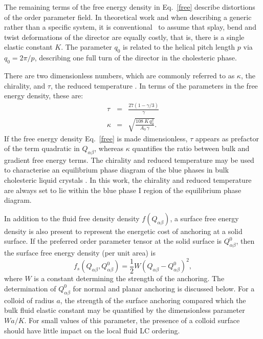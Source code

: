 \documentclass[12pt,twoside]{article}
\begin{document}
The remaining terms of the free energy density in Eq.~\ref{free} describe
distortions of the order parameter field. In theoretical work and when
describing a generic rather than a specific system, it is 
conventional~\cite{blue1,deGennes} to
assume that splay, bend and twist deformations of the director are equally
costly, that is, there is a single elastic constant $K$. The parameter $q_0$
is related to the helical pitch length $p$ via $q_0=2\pi/p$,
describing one full turn of the director in the cholesteric phase.

There are two dimensionless numbers, which are commonly referred to as
$\kappa$, the chirality, and  $\tau$, the reduced temperature
\cite{blue1}.  In terms of the parameters in the free energy density,
these are:
\begin{eqnarray}\label{cntrl-param} 
\tau&=&\frac{27(1-\gamma/3)}{\gamma}\label{tau}\\
\kappa&=&\sqrt{\frac{108\ K\, q_0^2}{A_0\, \gamma}}\label{kappa}.
\end{eqnarray}
If the free energy density Eq.~\ref{free} is made dimensionless, $\tau$
appears as prefactor of the term  quadratic in $Q_{\alpha\beta}$,
whereas $\kappa$
quantifies the ratio between bulk and  gradient free energy terms. The
chirality and reduced temperature may be used to characterise an equilibrium
phase diagram of the blue phases in bulk cholesteric liquid crystals
\cite{blue1,oliver1}.
In this work, the chirality and reduced temperature are always set to lie
within the blue phase I region of the equilibrium phase diagram.

In addition to the fluid free density density $f(Q_{\alpha\beta})$, a surface
free energy density is also present to represent the energetic cost of
anchoring at a solid surface. If the preferred order parameter tensor
at the solid surface is $Q^0_{\alpha\beta}$, then the surface free energy
density (per unit area) is
\begin{equation}
f_s(Q_{\alpha\beta}, Q^0_{\alpha\beta})
= {\textstyle \frac{1}{2}}W(Q_{\alpha\beta} - Q^0_{\alpha\beta})^2,
\end{equation}
where $W$ is a constant determining the strength of the anchoring.
The determination of $Q^0_{\alpha\beta}$ for normal and planar anchoring is
discussed below. For a colloid of radius $a$, the strength of the surface
anchoring compared which the bulk fluid elastic constant may be quantified
by the dimensionless parameter $Wa/K$. For small values of this parameter,
the presence of a colloid surface should have little impact on the local
fluid LC ordering.
\end{document}
